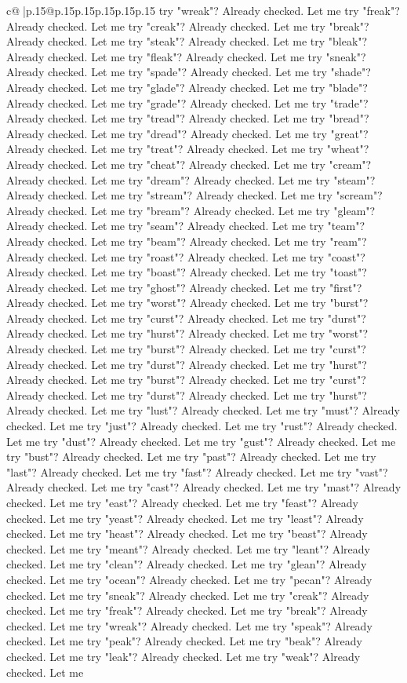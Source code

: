 \documentclass{article}
\begin{document}
{\begin{supertabular}{c@{$\;$}|p{.15\linewidth}@{}p{.15\linewidth}p{.15\linewidth}p{.15\linewidth}p{.15\linewidth}p{.15\linewidth}}
{{{try "wreak"? Already checked. Let me try "freak"? Already checked. Let me try "creak"? Already checked. Let me try "break"? Already checked. Let me try "steak"? Already checked. Let me try "bleak"? Already checked. Let me try "fleak"? Already checked. Let me try "sneak"? Already checked. Let me try "spade"? Already checked. Let me try "shade"? Already checked. Let me try "glade"? Already checked. Let me try "blade"? Already checked. Let me try "grade"? Already checked. Let me try "trade"? Already checked. Let me try "tread"? Already checked. Let me try "bread"? Already checked. Let me try "dread"? Already checked. Let me try "great"? Already checked. Let me try "treat"? Already checked. Let me try "wheat"? Already checked. Let me try "cheat"? Already checked. Let me try "cream"? Already checked. Let me try "dream"? Already checked. Let me try "steam"? Already checked. Let me try "stream"? Already checked. Let me try "scream"? Already checked. Let me try "bream"? Already checked. Let me try "gleam"? Already checked. Let me try "seam"? Already checked. Let me try "team"? Already checked. Let me try "beam"? Already checked. Let me try "ream"? Already checked. Let me try "roast"? Already checked. Let me try "coast"? Already checked. Let me try "boast"? Already checked. Let me try "toast"? Already checked. Let me try "ghost"? Already checked. Let me try "first"? Already checked. Let me try "worst"? Already checked. Let me try "burst"? Already checked. Let me try "curst"? Already checked. Let me try "durst"? Already checked. Let me try "hurst"? Already checked. Let me try "worst"? Already checked. Let me try "burst"? Already checked. Let me try "curst"? Already checked. Let me try "durst"? Already checked. Let me try "hurst"? Already checked. Let me try "burst"? Already checked. Let me try "curst"? Already checked. Let me try "durst"? Already checked. Let me try "hurst"? Already checked. Let me try "lust"? Already checked. Let me try "must"? Already checked. Let me try "just"? Already checked. Let me try "rust"? Already checked. Let me try "dust"? Already checked. Let me try "gust"? Already checked. Let me try "bust"? Already checked. Let me try "past"? Already checked. Let me try "last"? Already checked. Let me try "fast"? Already checked. Let me try "vast"? Already checked. Let me try "cast"? Already checked. Let me try "mast"? Already checked. Let me try "east"? Already checked. Let me try "feast"? Already checked. Let me try "yeast"? Already checked. Let me try "least"? Already checked. Let me try "heast"? Already checked. Let me try "beast"? Already checked. Let me try "meant"? Already checked. Let me try "leant"? Already checked. Let me try "clean"? Already checked. Let me try "glean"? Already checked. Let me try "ocean"? Already checked. Let me try "pecan"? Already checked. Let me try "sneak"? Already checked. Let me try "creak"? Already checked. Let me try "freak"? Already checked. Let me try "break"? Already checked. Let me try "wreak"? Already checked. Let me try "speak"? Already checked. Let me try "peak"? Already checked. Let me try "beak"? Already checked. Let me try "leak"? Already checked. Let me try "weak"? Already checked. Let me }}}
\end{supertabular}}
\end{document}
